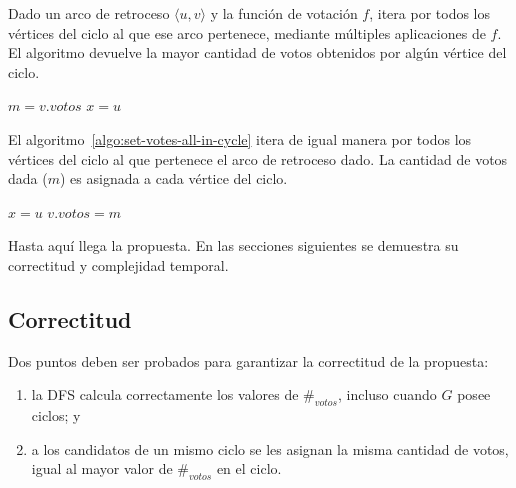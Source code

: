 \begin{algorithm}[!h]
    \caption{\cyclevotescaption}
    \label{algo:votes-cycles}
    \DontPrintSemicolon
    \SetAlgoLined
    \BlankLine

\end{algorithm}

Dado un arco de retroceso $\langle u, v \rangle$ y la funci\'on de votaci\'on $f$, \maxincyclecaption \;itera por todos los v\'ertices del ciclo al que ese arco pertenece, mediante m\'ultiples aplicaciones de $f$. El algoritmo devuelve la mayor cantidad de votos obtenidos por alg\'un v\'ertice del ciclo. 

\begin{algorithm}[!h]
    \caption{\maxincyclecaption}
    \label{algo:max-in-cycle}
    \DontPrintSemicolon
    \SetAlgoLined
    \BlankLine

    $m = v.votos$\;\label{algo:max-in-cycle:line:m-declaration}
    $x = u$\;
    \;
\end{algorithm}

El algoritmo~\ref{algo:set-votes-all-in-cycle} itera de igual manera por todos los v\'ertices del ciclo al que pertenece el arco de retroceso dado. La cantidad de votos dada ($m$) es asignada a cada v\'ertice del ciclo.

\begin{algorithm}[!h]
    \caption{\setvotestoallincyclecaption}
    \label{algo:set-votes-all-in-cycle}
    \DontPrintSemicolon
    \SetAlgoLined
    \BlankLine

    $x = u$\;
    $v.votos = m$\;
\end{algorithm}

Hasta aqu\'i llega la propuesta. En las secciones siguientes se demuestra  su correctitud y complejidad temporal.

\subsection{Correctitud}
Dos puntos deben ser probados para garantizar la correctitud de la propuesta:
\begin{enumerate}
    \item \label{item:dfs-votes-num} la DFS calcula correctamente los valores de $\#_{votos}$, incluso cuando $G$ posee ciclos; y
    \item \label{item:reassign-votes} a los candidatos de un mismo ciclo se les asignan la misma cantidad de votos, igual al mayor valor de $\#_{votos}$ en el ciclo. 
\end{enumerate}

